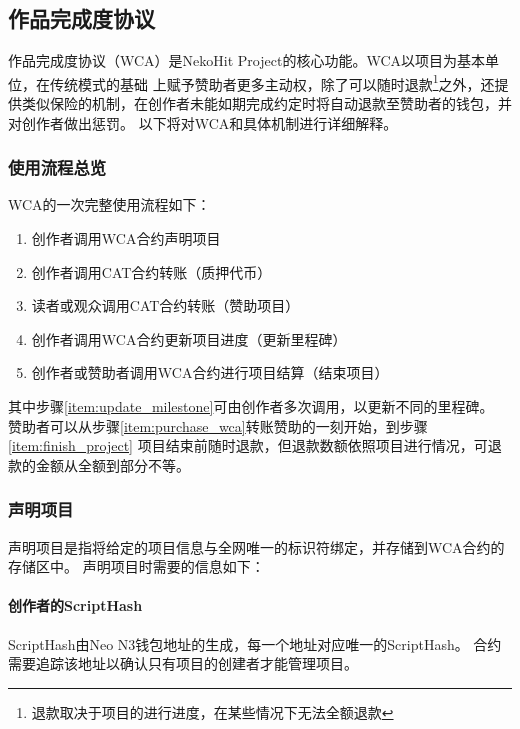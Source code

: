 \documentclass[11pt,UTF8,a4paper]{ctexart}
\begin{document}
    \subsection{作品完成度协议}\label{subsec:wca}

    作品完成度协议（WCA）是NekoHit Project的核心功能。WCA以项目为基本单位，在传统模式的基础
    上赋予赞助者更多主动权，除了可以随时退款\footnote{
        退款取决于项目的进行进度，在某些情况下无法全额退款
    }之外，还提供类似保险的机制，在创作者未能如期完成约定时将自动退款至赞助者的钱包，并对创作者做出惩罚。
    以下将对WCA和具体机制进行详细解释。

    \subsubsection{使用流程总览}

    WCA的一次完整使用流程如下：

    \begin{enumerate}
        \item 创作者调用WCA合约声明项目
        \item 创作者调用CAT合约转账（质押代币）
        \item 读者或观众调用CAT合约转账（赞助项目）\label{item:purchase_wca}
        \item 创作者调用WCA合约更新项目进度（更新里程碑）\label{item:update_milestone}
        \item 创作者或赞助者调用WCA合约进行项目结算（结束项目）\label{item:finish_project}
    \end{enumerate}

    其中步骤\ref{item:update_milestone}可由创作者多次调用，以更新不同的里程碑。
    赞助者可以从步骤\ref{item:purchase_wca}转账赞助的一刻开始，到步骤\ref{item:finish_project}
    项目结束前随时退款，但退款数额依照项目进行情况，可退款的金额从全额到部分不等。

    \subsubsection{声明项目}

    声明项目是指将给定的项目信息与全网唯一的标识符绑定，并存储到WCA合约的存储区中。
    声明项目时需要的信息如下：

    \paragraph{创作者的ScriptHash}

    ScriptHash由Neo N3钱包地址的生成，每一个地址对应唯一的ScriptHash。
    合约需要追踪该地址以确认只有项目的创建者才能管理项目。
\end{document}
